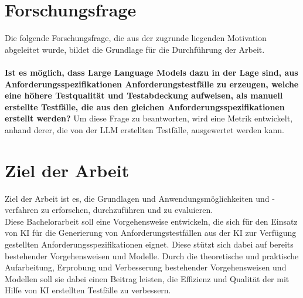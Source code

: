 \documentclass[12pt,toc=bib,toc=listof]{scrreprt}
\begin{document}
\section{Forschungsfrage} %
\label{sec:forschungsfrage}
Die folgende Forschungsfrage, die aus der zugrunde liegenden Motivation abgeleitet wurde, bildet die Grundlage für die Durchführung der Arbeit.\\
\\
\textbf{Ist es möglich, dass Large Language Models dazu in der Lage sind, aus Anforderungsspezifikationen Anforderungstestfälle zu erzeugen, welche eine höhere Testqualität und Testabdeckung aufweisen, als manuell erstellte Testfälle, die aus den gleichen Anforderungsspezifikationen erstellt werden?}  Um diese Frage zu beantworten, wird eine Metrik entwickelt, anhand derer, die von der LLM erstellten Testfälle, ausgewertet werden kann.

\section{Ziel der Arbeit} %
\label{sec:zielDerArbeit}
Ziel der Arbeit ist es, die Grundlagen und Anwendungsmöglichkeiten und -verfahren zu erforschen, durchzuführen und zu evaluieren.\\
Diese Bachelorarbeit soll eine Vorgehensweise entwickeln, die sich für den Einsatz von KI für die Generierung von Anforderungstestfällen aus der KI zur Verfügung gestellten Anforderungsspezifikationen eignet. Diese stützt sich dabei auf bereits bestehender Vorgehensweisen und Modelle. Durch die theoretische und praktische Aufarbeitung, Erprobung und Verbesserung bestehender Vorgehensweisen und Modellen soll sie dabei einen Beitrag leisten, die Effizienz und Qualität der mit Hilfe von KI erstellten Testfälle zu verbessern.
\end{document}

